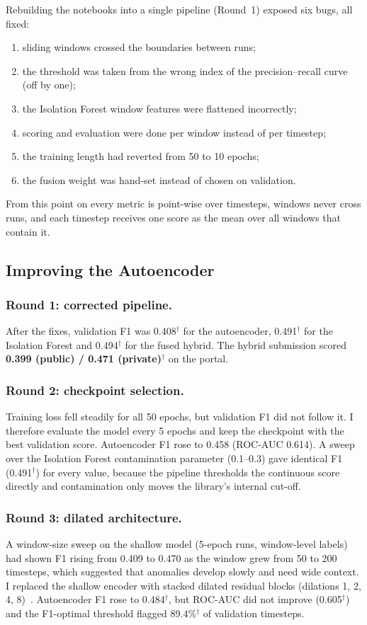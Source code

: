 \documentclass[runningheads]{llncs}
\newcommand{\doc}{$^\dagger$}
\begin{document}
Rebuilding the notebooks into a single pipeline (Round~1) exposed six bugs, all fixed:
\begin{enumerate}
  \item sliding windows crossed the boundaries between runs;
  \item the threshold was taken from the wrong index of the precision--recall curve (off by one);
  \item the Isolation Forest window features were flattened incorrectly;
  \item scoring and evaluation were done per window instead of per timestep;
  \item the training length had reverted from 50 to 10 epochs;
  \item the fusion weight was hand-set instead of chosen on validation.
\end{enumerate}
From this point on every metric is point-wise over timesteps, windows never cross runs, and each timestep receives one score as the mean over all windows that contain it.

\subsection{Improving the Autoencoder}

\subsubsection{Round 1: corrected pipeline.} After the fixes, validation F1 was 0.408\doc{} for the autoencoder, 0.491\doc{} for the Isolation Forest and 0.494\doc{} for the fused hybrid. The hybrid submission scored \textbf{0.399 (public) / 0.471 (private)}\doc{} on the portal.

\subsubsection{Round 2: checkpoint selection.} Training loss fell steadily for all 50 epochs, but validation F1 did not follow it. I therefore evaluate the model every 5 epochs and keep the checkpoint with the best validation score. Autoencoder F1 rose to 0.458 (ROC-AUC 0.614). A sweep over the Isolation Forest contamination parameter (0.1--0.3) gave identical F1 (0.491\doc) for every value, because the pipeline thresholds the continuous score directly and contamination only moves the library's internal cut-off.

\subsubsection{Round 3: dilated architecture.} A window-size sweep on the shallow model (5-epoch runs, window-level labels) had shown F1 rising from 0.409 to 0.470 as the window grew from 50 to 200 timesteps, which suggested that anomalies develop slowly and need wide context. I replaced the shallow encoder with stacked dilated residual blocks (dilations 1, 2, 4, 8)~\cite{bai2018empirical,oord2016wavenet}. Autoencoder F1 rose to 0.484\doc, but ROC-AUC did not improve (0.605\doc) and the F1-optimal threshold flagged 89.4\%\doc{} of validation timesteps.
\end{document}
